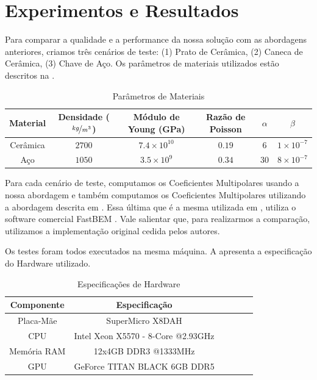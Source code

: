 \chapter{Experimentos e Resultados}

Para comparar a qualidade e a performance da nossa solução com as abordagens anteriores, criamos três cenários de teste: (1) Prato de Cerâmica, (2) Caneca de Cerâmica, (3) Chave de Aço. Os parâmetros de materiais utilizados estão descritos na .

\begin{table}[ht]
\begin{center}
\begin{tabular}{c|ccccc}
Material & Densidade ($\nicefrac{kg}{m^3}$) & Módulo de Young (GPa) & Razão de Poisson & $\alpha$ & $\beta$\\
\hline Cerâmica & $2700$ & $7.4 \times 10^{10}$ & $0.19$ & $6$ & $1 \times 10^{-7}$\\
Aço & $1050$ & $3.5 \times 10^9$ & $0.34$ & $30$ & $8 \times 10^{-7}$\\
\end{tabular}
\end{center}
\caption{Parâmetros de Materiais}\label{tab:material_parameters}
\end{table}

Para cada cenário de teste, computamos os Coeficientes Multipolares usando a nossa abordagem e também computamos os Coeficientes Multipolares utilizando a abordagem descrita em \cite{zheng2010rigid}. Essa última que é a mesma utilizada em \cite{zheng2010rigid, zheng2011toward, langlois2014eigenmode}, utiliza o software comercial FastBEM \cite{fastbem}. Vale salientar que, para realizarmos a comparação, utilizamos a implementação original cedida pelos autores.

Os testes foram todos executados na mesma máquina. A  apresenta a especificação do Hardware utilizado.

\begin{table}[ht]
\begin{center}
\begin{tabular}{c|ccccc}
Componente & Especificação\\
\hline 
Placa-Mãe & SuperMicro X8DAH\\
CPU & Intel Xeon X5570 - 8-Core @2.93GHz\\
Memória RAM & 12x4GB DDR3 @1333MHz\\
GPU & GeForce TITAN BLACK 6GB DDR5
\end{tabular}
\end{center}
\caption{Especificações de Hardware}\label{tab:benchmark_hardware}
\end{table}

